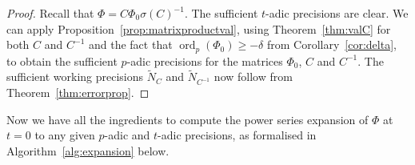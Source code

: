 \documentclass[a4paper,11pt]{article}
\numberwithin{equation}{section}
\DeclareMathOperator{\ord}{ord}          %
\theoremstyle{definition}
\begin{document}
\begin{proof}
Recall that $\Phi = C \Phi_0 \sigma(C)^{-1}$. The sufficient $t$-adic 
precisions are clear. We can apply Proposition~\ref{prop:matrixproductval}, 
using Theorem~\ref{thm:valC} for both $C$ and $C^{-1}$ and the fact that 
$\ord_p(\Phi_0) \geq -\delta$ from Corollary~\ref{cor:delta}, to obtain 
the sufficient $p$-adic precisions for the matrices $\Phi_0$, $C$ and $C^{-1}$. 
The sufficient working precisions $\tilde{N}_C$ and $\tilde{N}_{C^{-1}}$
now follow from Theorem~\ref{thm:errorprop}.
\end{proof}

Now we have all the ingredients to compute the power series expansion of 
$\Phi$ at $t=0$ to any given $p$-adic and $t$-adic precisions, as formalised 
in Algorithm~\ref{alg:expansion} below.
\end{document}
